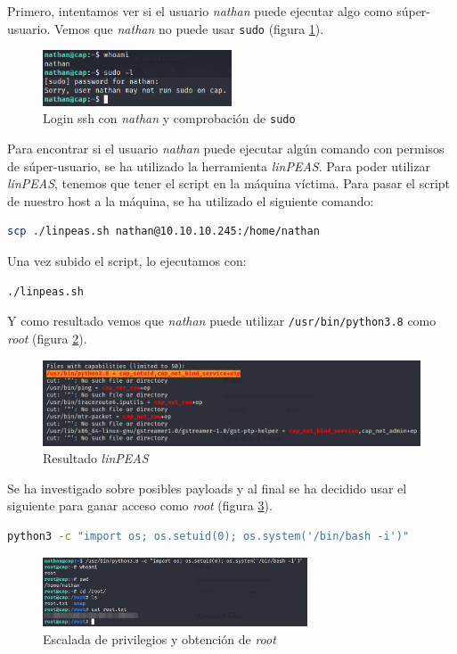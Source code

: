 Primero, intentamos ver si el usuario \textit{nathan} puede ejecutar algo como súper-usuario. Vemos que \textit{nathan} no puede usar \texttt{sudo} (figura \ref{fig:cap-nathan-sudo}).

\begin{figure}[h]
    \centering
    \includegraphics[width=0.5\textwidth]{images/machines/cap/nathan-sudo.png}
    \caption{Login \acrshort{ssh} con \textit{nathan} y comprobación de \texttt{sudo}}
    \label{fig:cap-nathan-sudo}
\end{figure}

Para encontrar si el usuario \textit{nathan} puede ejecutar algún comando con permisos de súper-usuario, se ha utilizado la herramienta \textit{linPEAS}\cite{peas}. Para poder utilizar \textit{linPEAS}, tenemos que tener el script en la máquina víctima. Para pasar el script de nuestro host a la máquina, se ha utilizado el siguiente comando:
\begin{lstlisting}[language=bash]
scp ./linpeas.sh nathan@10.10.10.245:/home/nathan
\end{lstlisting}

Una vez subido el script, lo ejecutamos con:
\begin{lstlisting}[language=bash]
./linpeas.sh
\end{lstlisting}

Y como resultado vemos que \textit{nathan} puede utilizar \texttt{/usr/bin/python3.8} como \textit{root} (figura \ref{fig:cap-linpeas}).\\

\begin{figure}[h]
    \centering
    \includegraphics[width=1.0\textwidth]{images/machines/cap/linpeas.png}
    \caption{Resultado \textit{linPEAS}}
    \label{fig:cap-linpeas}
\end{figure}

Se ha investigado sobre posibles payloads y al final se ha decidido usar el siguiente para ganar acceso como \textit{root} (figura \ref{fig:cap-root}).
\begin{lstlisting}[language=bash]
python3 -c "import os; os.setuid(0); os.system('/bin/bash -i')"
\end{lstlisting}

\begin{figure}[h]
    \centering
    \includegraphics[width=0.7\textwidth]{images/machines/cap/root.png}
    \caption{Escalada de privilegios y obtención de \textit{root}}
    \label{fig:cap-root}
\end{figure}
